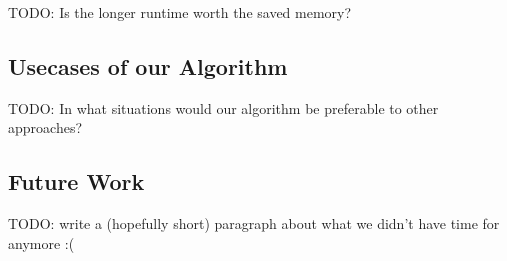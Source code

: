 \documentclass[12pt,a4paper,twoside]{scrartcl}
\numberwithin{equation}{section}
\begin{document}
TODO: Is the longer runtime worth the saved memory?

\subsection{Usecases of our Algorithm}

TODO: In what situations would our algorithm be preferable to other approaches?

\subsection{Future Work}

TODO: write a (hopefully short) paragraph about what we didn't have time for anymore :(


\clearpage


\appendix
\end{document}
